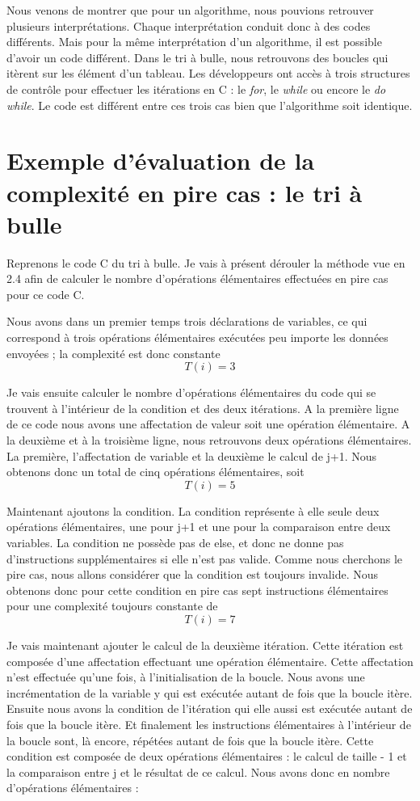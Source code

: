 \documentclass[12pt, twoside, openright]{report}
\begin{document}
Nous venons de montrer que pour un algorithme, nous pouvions retrouver plusieurs interprétations. Chaque interprétation conduit donc à des codes différents. Mais pour la même interprétation d'un algorithme, il est possible d'avoir un code différent. Dans le tri à bulle, nous retrouvons des boucles qui itèrent sur les élément d'un tableau. Les développeurs ont accès à trois structures de contrôle pour effectuer les itérations en C : le \textit{for}, le \textit{while} ou encore le \textit{do while}. Le code est différent entre ces trois cas bien que l'algorithme soit identique. 

\section{Exemple d'évaluation de la complexité en pire cas : le tri à bulle}

Reprenons le code C du tri à bulle. Je vais à présent dérouler la méthode vue en 2.4 afin de calculer le nombre d'opérations élémentaires effectuées en pire cas pour ce code C. 

Nous avons dans un premier temps trois déclarations de variables, ce qui correspond à trois opérations élémentaires exécutées peu importe les données envoyées ; la complexité est donc constante \[T(i) = 3\]

Je vais ensuite calculer le nombre d'opérations élémentaires du code qui se trouvent à l'intérieur de la condition et des deux itérations. A la première ligne de ce code nous avons une affectation de valeur soit une opération élémentaire. A la deuxième et à la troisième ligne, nous retrouvons deux opérations élémentaires. La première, l'affectation de variable et la deuxième le calcul de j+1. Nous obtenons donc un total de cinq opérations élémentaires, soit \[T(i) = 5\]

Maintenant ajoutons la condition. La condition représente à elle seule deux opérations élémentaires, une pour j+1 et une pour la comparaison entre deux variables. La condition ne possède pas de else, et donc ne donne pas d'instructions supplémentaires si elle n'est pas valide. Comme nous cherchons le pire cas, nous allons considérer que la condition est toujours invalide. Nous obtenons donc pour cette condition en pire cas sept instructions élémentaires pour une complexité toujours constante de \[T(i) = 7\] 

Je vais maintenant ajouter le calcul de la deuxième itération. Cette itération est composée d'une affectation effectuant une opération élémentaire. Cette affectation n'est effectuée qu'une fois, à l'initialisation de la boucle. Nous avons une incrémentation de la variable y qui est exécutée autant de fois que la boucle itère. Ensuite nous avons la condition de l'itération qui elle aussi est exécutée autant de fois que la boucle itère. Et finalement les instructions élémentaires à l'intérieur de la boucle sont, là encore, répétées autant de fois que la boucle itère. Cette condition est composée de deux opérations élémentaires : le calcul de taille - 1 et la comparaison entre j et le résultat de ce calcul. Nous avons donc en nombre d'opérations élémentaires :
\end{document}
